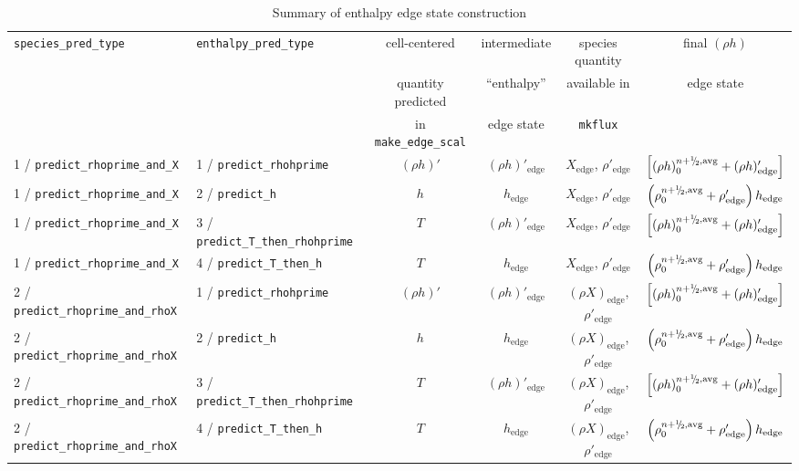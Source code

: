 \begin{landscape}
\begin{table}[t]
\caption{Summary of enthalpy edge state construction}
\label{table:pred:hoverview}
\renewcommand{\arraystretch}{1.5}
{\small
\centering
\begin{tabular}{l|l|c|c|c|c}
\hline
\hline
{\tt species\_pred\_type} &   
{\tt enthalpy\_pred\_type} &
{cell-centered} &
{intermediate} &
{species quantity} &
{final $(\rho h)$} \\[-5pt]
 &
 &
{quantity predicted} &
{``enthalpy''} &
{available in} &
{edge state} \\[-5pt]
 &
 &
{in {\tt make\_edge\_scal}} &
{edge state} &
{\tt mkflux} &
 \\
\hline 
1 / {\tt predict\_rhoprime\_and\_X}  & 1 / {\tt predict\_rhohprime} &
  $(\rho h)'$ & $(\rho h)'_\mathrm{edge}$ & 
  $X_\mathrm{edge}$, $\rho'_\mathrm{edge}$ & 
  $\left [ (\rho h)_0^{n+\myhalf,{\rm avg}} + (\rho h)'_\mathrm{edge} \right ]$ \\
1 / {\tt predict\_rhoprime\_and\_X}  & 2 / {\tt predict\_h} &
  $h$ & $h_\mathrm{edge}$ & 
  $X_\mathrm{edge}$, $\rho'_\mathrm{edge}$ & 
  $\left ( \rho_0^{n+\myhalf,{\rm avg}} + \rho'_\mathrm{edge} \right ) h_\mathrm{edge}$ \\
1 / {\tt predict\_rhoprime\_and\_X}  & 3 / {\tt predict\_T\_then\_rhohprime} &
  $T$ & $(\rho h)'_\mathrm{edge}$ & 
  $X_\mathrm{edge}$, $\rho'_\mathrm{edge}$ & 
  $\left [ (\rho h)_0^{n+\myhalf,{\rm avg}} + (\rho h)'_\mathrm{edge} \right ]$ \\
1 / {\tt predict\_rhoprime\_and\_X}  & 4 / {\tt predict\_T\_then\_h} &
  $T$ & $h_\mathrm{edge}$ & 
  $X_\mathrm{edge}$, $\rho'_\mathrm{edge}$ & 
  $\left ( \rho_0^{n+\myhalf,{\rm avg}} + \rho'_\mathrm{edge} \right ) h_\mathrm{edge}$ \\
\hline
\hline
2 / {\tt predict\_rhoprime\_and\_rhoX}  & 1 / {\tt predict\_rhohprime} &
  $(\rho h)'$ & $(\rho h)'_\mathrm{edge}$ & 
  $(\rho X)_\mathrm{edge}$, $\rho'_\mathrm{edge}$ & 
  $\left [ (\rho h)_0^{n+\myhalf,{\rm avg}} + (\rho h)'_\mathrm{edge} \right ]$ \\
2 / {\tt predict\_rhoprime\_and\_rhoX}  & 2 / {\tt predict\_h} &
  $h$ & $h_\mathrm{edge}$ & 
  $(\rho X)_\mathrm{edge}$, $\rho'_\mathrm{edge}$ & 
  $\left ( \rho_0^{n+\myhalf,{\rm avg}} + \rho'_\mathrm{edge} \right ) h_\mathrm{edge}$ \\
2 / {\tt predict\_rhoprime\_and\_rhoX}  & 3 / {\tt predict\_T\_then\_rhohprime} &
  $T$ & $(\rho h)'_\mathrm{edge}$ & 
  $(\rho X)_\mathrm{edge}$, $\rho'_\mathrm{edge}$ & 
  $\left [ (\rho h)_0^{n+\myhalf,{\rm avg}} + (\rho h)'_\mathrm{edge} \right ]$ \\
2 / {\tt predict\_rhoprime\_and\_rhoX}  & 4 / {\tt predict\_T\_then\_h} &
  $T$ & $h_\mathrm{edge}$ & 
  $(\rho X)_\mathrm{edge}$, $\rho'_\mathrm{edge}$ & 
  $\left ( \rho_0^{n+\myhalf,{\rm avg}} + \rho'_\mathrm{edge} \right ) h_\mathrm{edge}$ \\
\hline
\end{tabular}
} %
\end{table}
\end{landscape}


